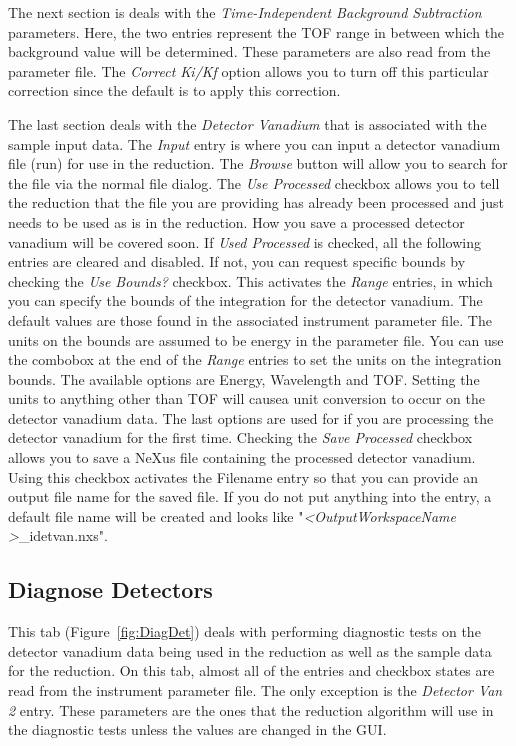 The next section is deals with the \textit{Time-Independent Background Subtraction} parameters. Here, the two entries represent the TOF range in between which the background value will be determined. These parameters are also read from the parameter file. The \textit{Correct Ki/Kf} option allows you to turn off this particular correction since the default is to apply this correction.

The last section deals with the \textit{Detector Vanadium} that is associated with the sample input data. The \textit{Input} entry is where you can input a detector vanadium file (run) for use in the reduction. The \textit{Browse} button will allow you to search for the file via the normal file dialog. The \textit{Use Processed} checkbox allows you to tell the reduction that the file you are providing has already been processed and just needs to be used as is in the reduction. How you save a processed detector vanadium will be covered soon. If \textit{Used Processed} is checked, all the following entries are cleared and disabled. If not, you can request specific bounds by checking the \textit{Use Bounds?} checkbox. This activates the \textit{Range} entries, in which you can specify the bounds of the integration for the detector vanadium. The default values are those found in the associated instrument parameter file. The units on the bounds are assumed to be energy in the parameter file. You can use the combobox at the end of the \textit{Range} entries to set the units on the integration bounds. The available options are Energy, Wavelength and TOF. Setting the units to anything other than TOF will causea unit conversion to occur on the detector vanadium data. The last options are used for if you are processing the detector vanadium for the first time. Checking the \textit{Save Processed} checkbox allows you to save a NeXus file containing the processed detector vanadium. Using this checkbox activates the Filename entry so that you can provide an output file name for the saved file. If you do not put anything into the entry, a default file name will be created and looks like "\textit{\textless OutputWorkspaceName \textgreater}\_idetvan.nxs". 
\subsection{Diagnose Detectors}
This tab (Figure~\ref{fig:DiagDet}) deals with performing diagnostic tests on the detector vanadium data being used in the reduction as well as the sample data for the reduction. On this tab, almost all of the entries and checkbox states are read from the instrument parameter file. The only exception is the \textit{Detector Van 2} entry. These parameters are the ones that the reduction algorithm will use in the diagnostic tests unless the values are changed in the GUI. 

